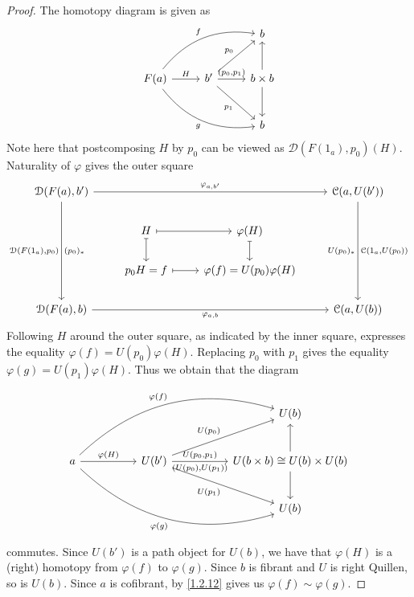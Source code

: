 \begin{proof}
	The homotopy diagram is given as
	\[\begin{tikzcd}[row sep = 2.5em, column sep = 2.5em]
	 &  & b \\
	F(a)\ar[" f ", bend left, urr] \ar[" g "', bend right, drr] \ar[" H ", r]  & b' \ar[" (p_0\text{,} p_1) ", r] \ar[" p_0 ", ur] \ar[" p_1 "', dr]  & b\times b \ar[u] \ar[d]  \\
	 &  & b
	\end{tikzcd}\]
	Note here that postcomposing $H$ by $p_0$ can be viewed as $\mathcal{D} (F(1_a),p_0)(H)$. Naturality of $\varphi$ gives the outer square
	\[\begin{tikzcd}
	{\mathcal{D}(F(a),b')} &&& {\mathcal{C}(a,U(b'))} \\
	& H & {\varphi(H)} \\
	& {p_0H=f} & {\varphi(f)=U(p_0)\varphi(H)} \\
	{\mathcal{D}(F(a),b)} &&& {\mathcal{C}(a,U(b))}
	\arrow["{\varphi_{a,b'}}", from=1-1, to=1-4]
	\arrow["{\mathcal{D}(F(1_a),p_0)}"', " (p_0)_* ",  from=1-1, to=4-1]
	\arrow["{\mathcal{C}(1_a,U(p_0))}", " U(p_0)_* "', from=1-4, to=4-4]
	\arrow[maps to, from=2-2, to=2-3]
	\arrow[maps to, from=2-2, to=3-2]
	\arrow[maps to, from=2-3, to=3-3]
	\arrow[maps to, from=3-2, to=3-3]
	\arrow["{\varphi_{a,b}}"', from=4-1, to=4-4]
	\end{tikzcd}\]
	Following $H$ around the outer square, as indicated by the inner square, expresses the equality $\varphi(f)=U(p_0)\varphi(H)$. Replacing $p_0$ with $p_1$ gives the equality $\varphi(g)=U(p_1)\varphi(H)$. Thus we obtain that the diagram
	\[\begin{tikzcd}[row sep = 2.5em, column sep = 5em]
	 &  & U(b) \\
	a \ar[" \varphi(H) ", r] \ar[" \varphi (f)", bend left, urr] \ar[" \varphi (g)"', bend right, drr]  & U(b')\ar[" U(p_0) ", ur] \ar[" U(p_1) "', dr] \ar[" U(p_0\text{,} p_1) ", " (U(p_0)\text{,} U(p_1)) "', r]  & U(b\times b)\cong U(b)\times U(b)\ar[u] \ar[d]  \\
	 &  & U(b)
	\end{tikzcd}\]
	commutes. Since $U(b')$ is a path object for $U(b)$, we have that $\varphi(H)$ is a (right) homotopy from $\varphi(f)$ to $\varphi(g)$. Since $b$ is fibrant and $U$ is right Quillen, so is $U(b)$. Since $a$ is cofibrant, by \cref{1.2.12} gives us $\varphi(f)\sim \varphi(g)$.


\end{proof}
